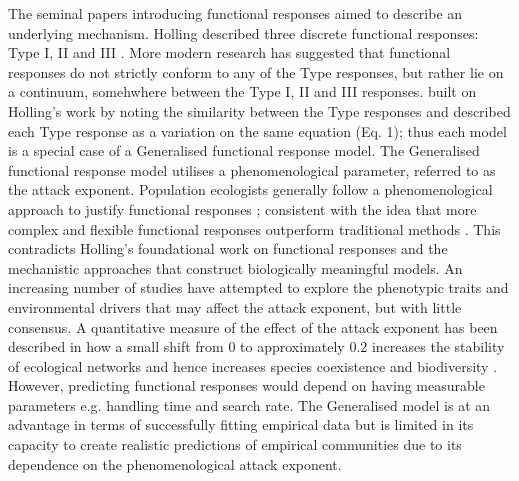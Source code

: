 \documentclass[11pt]{article}
\begin{document}
        The seminal papers introducing functional responses aimed to describe an underlying mechanism. Holling described three discrete functional responses: Type I, II \citep{holling1959some} and III \citep{holling1959some}. More modern research has suggested that functional responses do not strictly conform to any of the Type responses, but rather lie on a continuum, somehwhere between the Type I, II and III responses. \citet{real1977kinetics} built on Holling's work by noting the similarity between the Type responses and described each Type response as a variation on the same equation (Eq. 1); thus each model is a special case of a Generalised functional response model. The Generalised functional response model utilises a phenomenological parameter, referred to as the attack exponent. Population ecologists generally follow a phenomenological approach to justify functional responses \citep{jeschke2002predator}; consistent with the idea that more complex and flexible functional responses outperform traditional methods \citep{rosenbaum2018fitting}. This contradicts Holling's foundational work on functional responses and the mechanistic approaches that construct biologically meaningful models. An increasing number of studies have attempted to explore the phenotypic traits and environmental drivers that may affect the attack exponent, but with little consensus. A quantitative measure of the effect of the attack exponent has been described in how a small shift from 0 to approximately 0.2 increases the stability of ecological networks \citep{williams2004stabilization} and hence increases species coexistence and biodiversity \citep{c2008food}. However, predicting functional responses would depend on having measurable parameters e.g. handling time and search rate. The Generalised model is at an advantage in terms of successfully fitting empirical data but is limited in its capacity to create realistic predictions of empirical communities due to its dependence on the phenomenological attack exponent.
            
\end{document}
